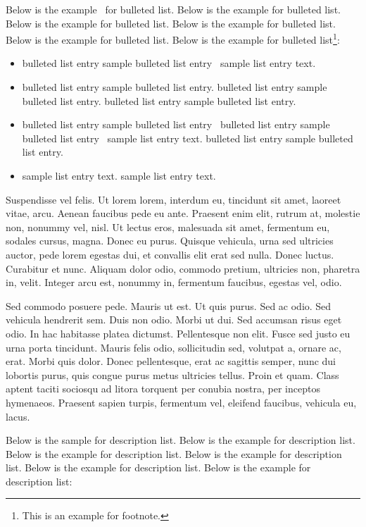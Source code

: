 \documentclass[AMS,STIX2COL]{WileyNJD-v2}
\begin{document}
    Below is the example~\cite{Rothermel1998,Yoo2007,Schulz2012} for bulleted list. Below is the example for bulleted list. Below is the example for bulleted list. Below is the example for bulleted list. Below is the example for bulleted list. Below is the example for bulleted list\footnote{This is an example for footnote.}:
    \begin{itemize}
        \item bulleted list entry sample bulleted list entry~\cite{Allen2011} sample list entry text.
        \item bulleted list entry sample bulleted list entry. bulleted list entry sample bulleted list entry. bulleted list entry sample bulleted list entry.
        \item bulleted list entry sample bulleted list entry~\cite{Ballen2011} bulleted list entry sample bulleted list entry~\citet{Allen2011} sample list entry text. bulleted list entry sample bulleted list entry.
        \item sample list entry text. sample list entry text.
    \end{itemize}

    Suspendisse vel felis. Ut lorem lorem, interdum eu, tincidunt sit amet, laoreet vitae, arcu. Aenean faucibus pede eu
    ante. Praesent enim elit, rutrum at, molestie non, nonummy vel, nisl. Ut lectus eros, malesuada sit amet, fermentum
    eu, sodales cursus, magna. Donec eu purus. Quisque vehicula, urna sed ultricies auctor, pede lorem egestas dui, et
    convallis elit erat sed nulla. Donec luctus. Curabitur et nunc. Aliquam dolor odio, commodo pretium, ultricies non,
    pharetra in, velit. Integer arcu est, nonummy in, fermentum faucibus, egestas vel, odio.

    Sed commodo posuere pede. Mauris ut est. Ut quis purus. Sed ac odio. Sed vehicula hendrerit sem. Duis non
    odio. Morbi ut dui. Sed accumsan risus eget odio. In hac habitasse platea dictumst. Pellentesque non elit. Fusce
    sed justo eu urna porta tincidunt. Mauris felis odio, sollicitudin sed, volutpat a, ornare ac, erat. Morbi quis dolor. Donec pellentesque, erat ac sagittis semper, nunc dui lobortis purus, quis congue purus metus ultricies tellus. Proin
    et quam. Class aptent taciti sociosqu ad litora torquent per conubia nostra, per inceptos hymenaeos. Praesent sapien
    turpis, fermentum vel, eleifend faucibus, vehicula eu, lacus.


    Below is the sample for description list. Below is the example for description list. Below is the example for description list. Below is the example for description list. Below is the example for description list. Below is the example for description list:\\[12pt]
\end{document}

